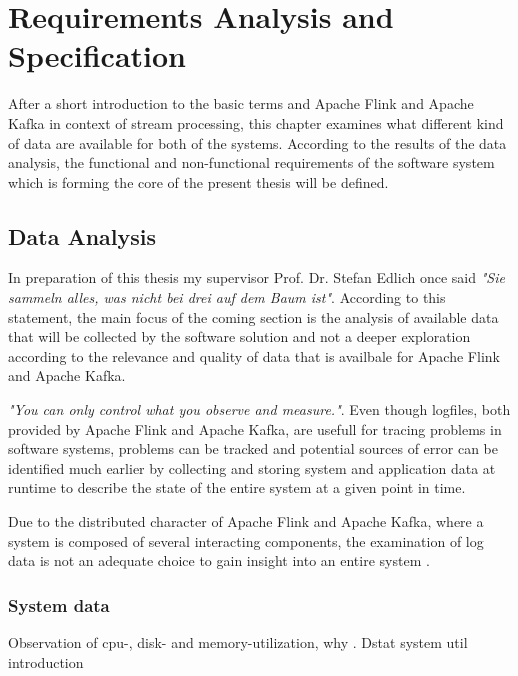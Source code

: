 \chapter{Requirements Analysis and Specification}

After a short introduction to the basic terms and Apache Flink and Apache Kafka in context of stream processing, this chapter
examines what different kind of data are available for both of the systems. According to the results of the data analysis, the
functional and non-functional requirements of the software system which is forming the core of the present thesis will be defined.

\section{Data Analysis}

In preparation of this thesis my supervisor Prof. Dr. Stefan Edlich once said \textit{"Sie sammeln
alles, was nicht bei drei auf dem Baum ist"}. According to this statement, the main focus of the coming section
is the analysis of available data that will be collected by the software solution and not a deeper exploration according
to the relevance and quality of data that is availbale for Apache Flink and Apache Kafka.

\textit{"You can only control what you observe and measure."}\cite{Ebert07}. Even though logfiles, both provided by
Apache Flink and Apache Kafka, are usefull for tracing problems in software systems, problems can be tracked and potential
sources of error can be identified much earlier by collecting and storing system and application data at runtime to
describe the state of the entire system at a given point in time.

Due to the distributed character of Apache Flink and Apache Kafka, where a system is composed
of several interacting components, the examination of log data is not an adequate choice
to gain insight into an entire system \cite{VanL14}.



\subsection{System data}

Observation of cpu-, disk- and memory-utilization, why \cite{Hoeb12}.
Dstat system util introduction

